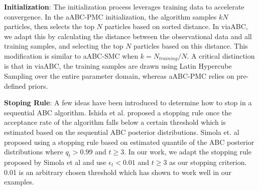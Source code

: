 \documentclass[12pt]{article} %
\begin{document}

\textbf{Initialization}: The initialization process leverages training data to accelerate convergence. In the aABC-PMC initialization, the algorithm samples $kN$ particles, then selects the top $N$ particles based on sorted distance\citep{simola2021adaptive}. In viaABC, we adapt this by calculating the distance between the observational data and all training samples, and selecting the top $N$ particles based on this distance. This modification is similar to aABC-SMC when $k = {N_{training}}/{N}$. A critical distinction is that in viaABC, the training samples are drawn using Latin Hypercube Sampling over the entire parameter domain, whereas aABC-PMC relies on pre-defined priors.

\textbf{Stoping Rule}: 
A few ideas have been introduced to determine how to stop in a sequential ABC algorithm. Ishida et al. \citep{ishida2015cosmoabc} proposed a stopping rule once the acceptance rate of the algorithm  falls below a certain threshold which is estimated based on the sequential ABC posterior distributions. Simola et. al \citep{simola2021adaptive} proposed using a stopping rule based on estimated quantile of the ABC posterior distributions where $q_t > 0.99$ and $ t \geq 3$. In our work, we adapt the stopping rule proposed by Simola et al and use $\epsilon_t < 0.01$ and $ t \geq 3$ as our stopping criterion. 0.01 is an arbitrary chosen threshold which has shown to work well in our examples.

\end{document}
